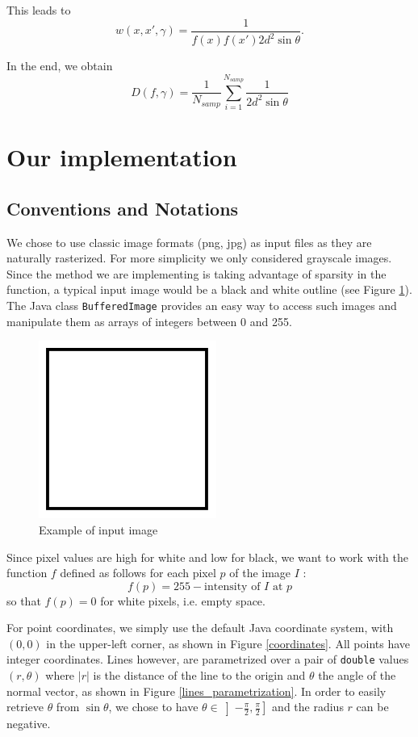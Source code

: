 \documentclass[10pt,a4paper]{article}			%
\begin{document}
This leads to $$ w(x, x',\gamma) = \frac{1}{f(x)f(x')2d^2\sin\theta}. $$

In the end, we obtain
\begin{equation}
D(f,\gamma) = \frac{1}{N_{samp}} \sum_{i=1}^{N_{samp}}\frac{1}{2d^2\sin\theta}
\label{equation_finale}
\end{equation} 

	
	\section{Our implementation}

	\subsection {Conventions and Notations}
We chose to use classic image formats (png, jpg) as input files as they are naturally rasterized. For more simplicity we only considered grayscale images. Since the method we are implementing is taking advantage of sparsity in the function, a typical input image would be a black and white outline (see Figure \ref{exemple_carre}). The Java class \texttt{BufferedImage} provides an easy way to access such images and manipulate them as arrays of integers between 0 and 255. 
\begin{figure}[h]
\begin{center}
\includegraphics[scale=0.5]{img/carre.png}
\caption{Example of input image}
\label{exemple_carre}
\end{center}
\end{figure}

Since pixel values are high for white and low for black, we want to work with the function $f$ defined as follows for each pixel $p$ of the image $I$ :
\[f(p) = 255 - \text{intensity of $I$ at $p$}\]
so that $f(p)=0$ for white pixels, i.e. empty space.

For point coordinates, we simply use the default Java coordinate system, with $(0,0)$ in the upper-left corner, as shown in Figure \ref{coordinates}. All points have integer coordinates. Lines however, are parametrized over a pair of \texttt{double} values $(r,\theta)$ where $|r|$ is the distance of the line to the origin and $\theta$ the angle of the normal vector, as shown in Figure \ref{lines_parametrization}. In order to easily retrieve $\theta$ from $\sin\theta$, we chose to have $\theta\in\left]-\frac{\pi}{2},\frac{\pi}{2}\right]$ and the radius $r$ can be negative.
\end{document}
